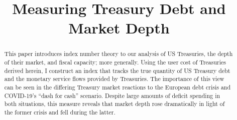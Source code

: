 \documentclass[11pt,a4paper,margin=1.5in]{article}
\title{Measuring Treasury Debt and Market Depth}
\begin{document}
\maketitle
\thispagestyle{empty}

\begin{abstract}


\noindent This paper introduces index number theory to our analysis of US Treasuries, the depth of their market, and fiscal capacity; more generally.
Using the user cost of Treasuries derived herein, I construct an index that tracks the true quantity of US Treasury debt and the monetary service flows provided by Treasuries. 
The importance of this view can be seen in the differing Treasury market reactions to the European debt crisis and COVID-19's ``dash for cash'' scenario.
Despite large amounts of deficit spending in both situations, this measure reveals that market depth rose dramatically in light of the former crisis and fell during the latter. 

\end{abstract}
\vspace{2em}
\end{document}
